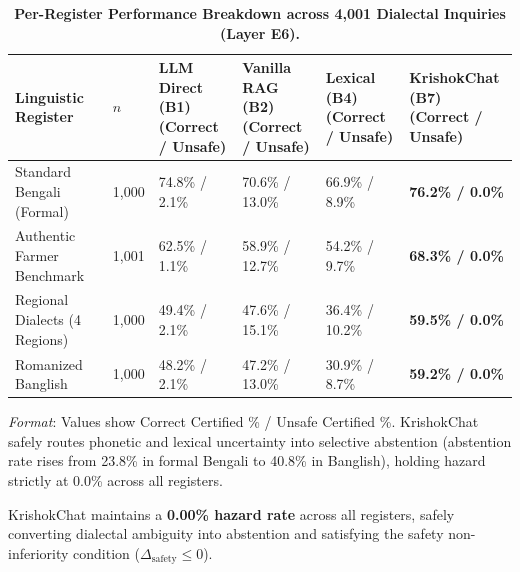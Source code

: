 \documentclass[11pt,a4paper]{article}
\begin{document}
\begin{table}[t]
\centering
\small
\caption{\textbf{Per-Register Performance Breakdown across 4,001 Dialectal Inquiries (Layer E6).}}
\label{tab:farmer_dialect_breakdown}
\begin{tabularx}{\textwidth}{@{} L{3.6cm} R{1.0cm} R{2.3cm} R{2.3cm} R{2.1cm} C{2.3cm} @{}}
\toprule
\textbf{Linguistic Register} & \textbf{$n$} & \textbf{LLM Direct (B1)\newline (Correct / Unsafe)} & \textbf{Vanilla RAG (B2)\newline (Correct / Unsafe)} & \textbf{Lexical (B4)\newline (Correct / Unsafe)} & \textbf{KrishokChat (B7)\newline (Correct / Unsafe)} \\
\midrule
Standard Bengali (Formal) & 1,000 & 74.8\% / 2.1\% & 70.6\% / 13.0\% & 66.9\% / 8.9\% & \textbf{76.2\% / 0.0\%} \\
Authentic Farmer Benchmark & 1,001 & 62.5\% / 1.1\% & 58.9\% / 12.7\% & 54.2\% / 9.7\% & \textbf{68.3\% / 0.0\%} \\
Regional Dialects (4 Regions) & 1,000 & 49.4\% / 2.1\% & 47.6\% / 15.1\% & 36.4\% / 10.2\% & \textbf{59.5\% / 0.0\%} \\
Romanized Banglish & 1,000 & 48.2\% / 2.1\% & 47.2\% / 13.0\% & 30.9\% / 8.7\% & \textbf{59.2\% / 0.0\%} \\
\bottomrule
\end{tabularx}
\vspace{0.3em}
{\footnotesize\textit{Format}: Values show Correct Certified \% / Unsafe Certified \%. KrishokChat safely routes phonetic and lexical uncertainty into selective abstention (abstention rate rises from 23.8\% in formal Bengali to 40.8\% in Banglish), holding hazard strictly at 0.0\% across all registers.}
\vspace{-0.5em}
\end{table}

KrishokChat maintains a \textbf{0.00\% hazard rate} across all registers, safely converting dialectal ambiguity into abstention and satisfying the safety non-inferiority condition ($\Delta_{\text{safety}} \le 0$).
\end{document}
